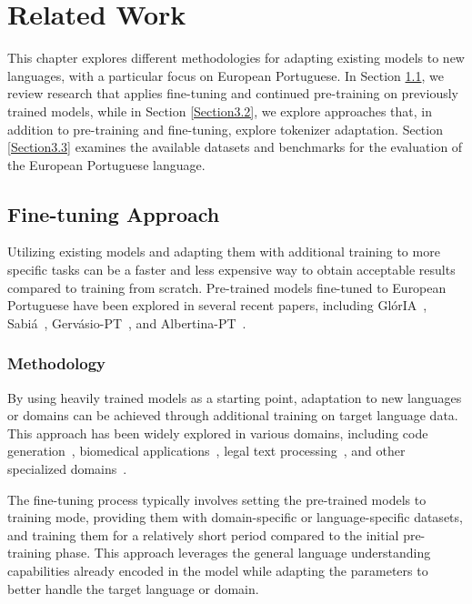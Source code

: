 \chapter{Related Work}
\label{Section3}

This chapter explores different methodologies for adapting existing models to new languages, with a particular focus on European Portuguese. In Section \ref{Section3.1}, we review research that applies fine-tuning and continued pre-training on previously trained models, while in Section \ref{Section3.2}, we explore approaches that, in addition to pre-training and fine-tuning, explore tokenizer adaptation. Section \ref{Section3.3} examines the available datasets and benchmarks for the evaluation of the European Portuguese language.

\section{Fine-tuning Approach}\label{Section3.1}
Utilizing existing models and adapting them with additional training to more specific tasks can be a faster and less expensive way to obtain acceptable results compared to training from scratch.
Pre-trained models fine-tuned to European Portuguese have been explored in several recent papers, including GlórIA~\cite{Gloria}, Sabiá~\cite{Sabia}, Gervásio-PT~\cite{Gervasio}, and Albertina-PT~\cite{Albertina}.

\subsection{Methodology}
By using heavily trained models as a starting point, adaptation to new languages or domains can be achieved through additional training on target language data. This approach has been widely explored in various domains, including code generation~\cite{chen2021evaluating}, biomedical applications~\cite{lee2020biobert}, legal text processing~\cite{chalkidis2020legal}, and other specialized domains~\cite{gururangan2020don}.

The fine-tuning process typically involves setting the pre-trained models to training mode, providing them with domain-specific or language-specific datasets, and training them for a relatively short period compared to the initial pre-training phase. This approach leverages the general language understanding capabilities already encoded in the model while adapting the parameters to better handle the target language or domain.

